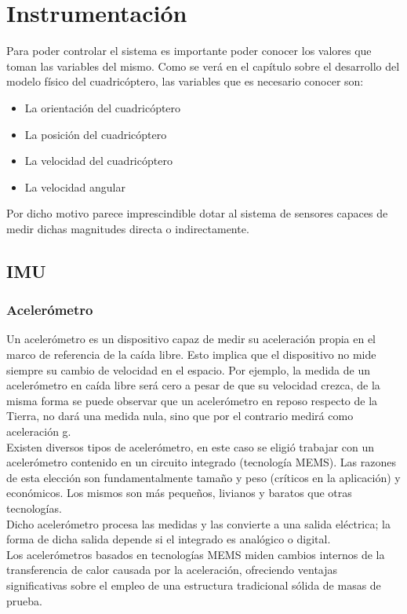 \documentclass[main]{subfiles}
\begin{document}
\section{Instrumentaci\'on}

Para poder controlar el sistema es importante poder conocer los valores que toman las variables del mismo. Como se ver\'a en el cap\'itulo sobre el desarrollo del modelo f\'isico del cuadric\'optero, las variables que es necesario conocer son:

\begin{itemize}
\item La orientaci\'on del cuadric\'optero 
\item La posici\'on del cuadric\'optero 
\item La velocidad del cuadric\'optero
\item La velocidad angular 
\end{itemize}

Por dicho motivo parece imprescindible dotar al sistema de sensores capaces de medir dichas magnitudes directa o indirectamente.
\subsection{IMU}

\subsubsection{Aceler\'ometro}
\label{acelerometro}

Un aceler\'ometro es un dispositivo capaz de medir su aceleraci\'on propia en el marco de referencia de la ca\'ida libre. Esto implica que el dispositivo no mide siempre su cambio de velocidad en el espacio. Por ejemplo, la medida de un aceler\'ometro en ca\'ida libre ser\'a cero a pesar de que su velocidad crezca, de la misma forma se puede observar que un aceler\'ometro en reposo respecto de la Tierra, no dar\'a una medida nula, sino que por el contrario medir\'a como aceleraci\'on g.\\

Existen diversos tipos de aceler\'ometro, en este caso se eligi\'o trabajar con un aceler\'ometro contenido en un circuito integrado (tecnolog\'ia MEMS). Las razones de esta elecci\'on son fundamentalmente tama\~no y peso (cr\'iticos en la aplicaci\'on) y econ\'omicos. Los mismos son m\'as peque\~nos, livianos y baratos que otras tecnolog\'ias.\\
Dicho aceler\'ometro procesa las medidas y las convierte a una salida el\'ectrica; la forma de dicha salida depende si el integrado es anal\'ogico o digital.\\
Los aceler\'ometros basados en tecnolog\'ias MEMS miden cambios internos de la transferencia de calor causada por la aceleraci\'on, ofreciendo ventajas significativas sobre el empleo de una estructura tradicional s\'olida de masas de prueba.\\
\end{document}
